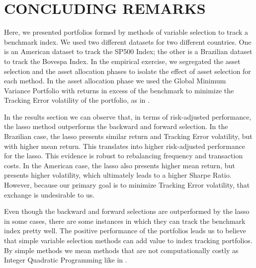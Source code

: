 \documentclass[12pt,oneside,a4paper]{memoir}
\begin{document}
\clearpage
\section{CONCLUDING REMARKS} \label{sec:conc}

Here, we presented portfolios formed by methods of variable selection to track a benchmark index.
We used two different datasets for two different countries.
One is an American dataset to track the SP500 Index; the other is a Brazilian dataset to track the Bovespa Index.
In the empirical exercise, we segregated the asset selection and the asset allocation phases to isolate the effect of asset selection for each method.
In the asset allocation phase we used the Global Minimum Variance Portfolio with returns in excess of the benchmark to minimize the Tracking Error volatility of the portfolio, as in .

In the results section we can observe that, in terms of risk-adjusted performance, the lasso method outperforms the backward and forward selection. 
In the Brazilian case, the lasso presents similar return and Tracking Error volatility, but with higher mean return.
This translates into higher risk-adjusted performance for the lasso.
This evidence is robust to rebalancing frequency and transaction costs.
In the American case, the lasso also presents higher mean return, but presents higher volatility, which ultimately leads to a higher Sharpe Ratio.
However, because our primary goal is to minimize Tracking Error volatility, that exchange is undesirable to us.

Even though the backward and forward selections are outperformed by the lasso in some cases, there are some instances in which they can track the benchmark index pretty well.
The positive performance of the portfolios leads us to believe that simple variable selection methods can add value to index tracking portfolios.
By simple methods we mean methods that are not computationally costly as Integer Quadratic Programming like in .



\clearpage



% 
% 
% 
\end{document}
